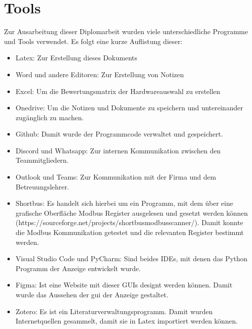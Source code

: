 \ifoot{\leftmark}
\chapter{Tools}
Zur Ausarbeitung dieser Diplomarbeit wurden viele unterschiedliche Programme und Tools verwendet. Es folgt eine kurze Auflistung dieser:
\begin{itemize}
	\item Latex: Zur Erstellung dieses Dokuments
	\item Word und andere Editoren: Zur Erstellung von Notizen
	\item Excel: Um die Bewertungsmatrix der Hardwareauswahl zu erstellen
	\item Onedrive: Um die Notizen und Dokumente zu speichern und untereinander zugänglich zu machen.
	\item Github: Damit wurde der Programmcode verwaltet und gespeichert.
	\item Discord und Whatsapp: Zur internen Kommunikation zwischen den Teammitgliedern.
	\item Outlook und Teams: Zur Kommunikation mit der Firma und dem Betreuungslehrer.
	\item Shortbus: Es handelt sich hierbei um ein Programm, mit dem über eine grafische Oberfläche Modbus Register ausgelesen und gesetzt werden können (https://sourceforge.net/projects/shortbusmodbusscanner/). Damit konnte die Modbus Kommunikation getestet und die relevanten Register bestimmt werden.
	\item Visual Studio Code und PyCharm: Sind beides IDEs, mit denen das Python Programm der Anzeige entwickelt wurde.
	\item Figma: Ist eine Website mit dieser GUIs designt werden können. Damit wurde das Aussehen der \acs{gui} der Anzeige gestaltet.
	\item Zotero: Es ist ein Literaturverwaltungsprogramm. Damit wurden Internetquellen gesammelt, damit sie in Latex importiert werden können.
\end{itemize}
